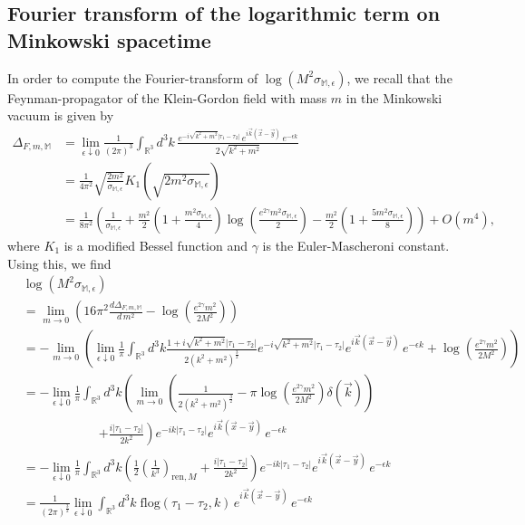 \documentclass[a4paper,10pt,twoside]{article}
\numberwithin{equation}{section}
\newcounter{and}
\def\bbR{\mathbb{R}}
\def\bbM{\mathbb{M}}
\theoremstyle{plain}
\theoremstyle{definition}
\begin{document}
\subsection{Fourier transform of the logarithmic term on Minkowski spacetime}
In order to compute the Fourier-transform of $\log\left( M^2 \sigma_{\bbM,\epsilon}\right)$, we recall that the Feynman-propagator of the Klein-Gordon field with mass $m$ in the Minkowski vacuum is given by
\begin{align*}
\Delta_{F,m,\bbM}&=\lim_{\epsilon\downarrow 0}\frac{1}{(2\pi)^3}\int_{\bbR^3}d^3k\, \frac{e^{-i\sqrt{k^2+m^2}|\tau_1-\tau_2|}\,e^{i\vec{k}\left(\vec{x}-\vec{y}\right)}\,e^{-\epsilon k}}{2\sqrt{k^2+m^2}}\\
&=\frac{1}{4\pi^2}\sqrt{\frac{2m^2}{\sigma_{\bbM,\epsilon}}}K_1\left(\sqrt{2 m^2\sigma_{\bbM,\epsilon}}\right)\\
&=\frac{1}{8\pi^2}\left(\frac{1}{\sigma_{\bbM,\epsilon}}+\frac{m^2}{2}\left(1+\frac{m^2 \sigma_{\bbM,\epsilon}}{4}\right)\log\left(\frac{e^{2\gamma}m^2\sigma_{\bbM,\epsilon}}{2}\right)-\frac{m^2}{2}\left(1+\frac{5m^2\sigma_{\bbM,\epsilon}}{8}\right)\right)+O(m^4),
\end{align*}
where $K_1$  is a modified Bessel function and $\gamma$ is the Euler-Mascheroni constant. Using this, we find
\begin{align*}
&\log \left(M^2 \sigma_{\bbM,\epsilon}\right)\\
&=\lim_{m\to 0}\left(16\pi^2 \frac{d\Delta_{F,m,\bbM}}{d \,m^2} - 
\log\left(\frac{e^{2\gamma}m^2}{2 M^2}\right)\right)\\
&=-\lim_{m\to 0}\left(\lim_{\epsilon\downarrow 0}\frac{1}{\pi}\int_{\bbR^3}d^3 k \frac{1+i\sqrt{k^2+m^2}|\tau_1-\tau_2|}{2(k^2+m^2)^{\frac32}}  e^{-i\sqrt{k^2+m^2}|\tau_1-\tau_2|}e^{i\vec{k}\left(\vec{x}-\vec{y}\right)}\,e^{-\epsilon k}+ \log\left(\frac{e^{2\gamma}m^2}{2 M^2}\right)\right)\\
&=-\lim_{\epsilon\downarrow 0}\frac{1}{\pi}\int_{\bbR^3}d^3 k\left(\lim_{m\to 0}\left(\frac{1}{2(k^2+m^2)^{\frac32}}-\pi\log\left(\frac{e^{2\gamma}m^2}{2 M^2}\right)\delta(\vec{k})\right)\right.\\
&\qquad\qquad\qquad \left.+\frac{i|\tau_1-\tau_2|}{2k^2}\right)e^{-ik|\tau_1-\tau_2|}e^{i\vec{k}\left(\vec{x}-\vec{y}\right)}\,e^{-\epsilon k}\\
&=-\lim_{\epsilon\downarrow 0}\frac{1}{\pi}\int_{\bbR^3}d^3 k\left(\frac{1}{2}\left(\frac{1}{k^3}\right)_{\text{ren},M}+\frac{i|\tau_1-\tau_2|}{2k^2}\right)e^{-ik|\tau_1-\tau_2|}e^{i\vec{k}\left(\vec{x}-\vec{y}\right)}\,e^{-\epsilon k}\\
&=\frac{1}{(2\pi)^{\frac32}}\lim_{\epsilon\downarrow 0}\int_{\bbR^3}d^3 k \;
\text{flog}(\tau_1-\tau_2,k)\,e^{i\vec{k}\left(\vec{x}-\vec{y}\right)}\,e^{-\epsilon k}
\end{align*}
\end{document}
